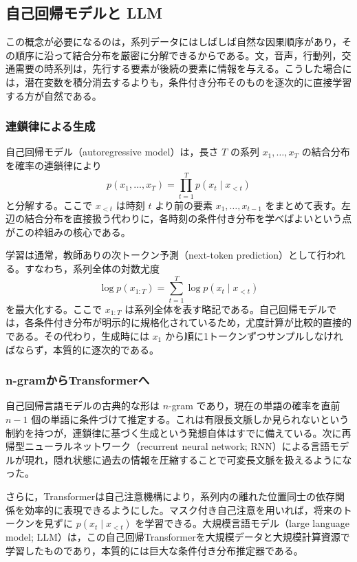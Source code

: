 \subsection{自己回帰モデルと LLM}

この概念が必要になるのは，系列データにはしばしば自然な因果順序があり，その順序に沿って結合分布を厳密に分解できるからである。文，音声，行動列，交通需要の時系列は，先行する要素が後続の要素に情報を与える。こうした場合には，潜在変数を積分消去するよりも，条件付き分布そのものを逐次的に直接学習する方が自然である。

\subsubsection{連鎖律による生成}

自己回帰モデル（autoregressive model）は，長さ \(T\) の系列 \(x_1,\dots,x_T\) の結合分布を確率の連鎖律により
\begin{equation}
p(x_1,\dots,x_T) = \prod_{t=1}^{T} p(x_t \mid x_{<t})
\end{equation}
と分解する。ここで \(x_{<t}\) は時刻 \(t\) より前の要素 \(x_1,\dots,x_{t-1}\) をまとめて表す。左辺の結合分布を直接扱う代わりに，各時刻の条件付き分布を学べばよいという点がこの枠組みの核心である。

学習は通常，教師ありの次トークン予測（next-token prediction）として行われる。すなわち，系列全体の対数尤度
\begin{equation}
\log p(x_{1:T})
=
\sum_{t=1}^{T}\log p(x_t \mid x_{<t})
\end{equation}
を最大化する。ここで \(x_{1:T}\) は系列全体を表す略記である。自己回帰モデルでは，各条件付き分布が明示的に規格化されているため，尤度計算が比較的直接的である。その代わり，生成時には \(x_1\) から順に1トークンずつサンプルしなければならず，本質的に逐次的である。

\subsubsection{n-gramからTransformerへ}

自己回帰言語モデルの古典的な形は \(n\)-gram であり，現在の単語の確率を直前 \(n-1\) 個の単語に条件づけて推定する。これは有限長文脈しか見られないという制約を持つが，連鎖律に基づく生成という発想自体はすでに備えている。次に再帰型ニューラルネットワーク（recurrent neural network; RNN）による言語モデルが現れ，隠れ状態に過去の情報を圧縮することで可変長文脈を扱えるようになった。

さらに，Transformer\cite{Vaswani2017}は自己注意機構により，系列内の離れた位置同士の依存関係を効率的に表現できるようにした。マスク付き自己注意を用いれば，将来のトークンを見ずに \(p(x_t \mid x_{<t})\) を学習できる。大規模言語モデル（large language model; LLM）は，この自己回帰Transformerを大規模データと大規模計算資源で学習したものであり，本質的には巨大な条件付き分布推定器である。

